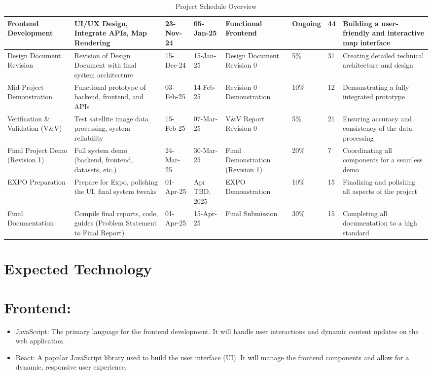 \documentclass{article}
\begin{document}
\begin{table}[h!]
\begin{adjustbox}{max width=\textwidth}
\begin{tabular}{|p{3cm}|p{5cm}|p{2.5cm}|p{2.5cm}|p{4cm}|p{2cm}|p{2.5cm}|p{4cm}|}
  Frontend Development & UI/UX Design, Integrate APIs, Map Rendering & 23-Nov-24 & 05-Jan-25 & Functional Frontend & Ongoing & 44 & Building a user-friendly and interactive map interface \\ \hline
  Design Document Revision & Revision of Design Document with final system architecture & 15-Dec-24 & 15-Jan-25 & Design Document Revision 0 & 5\% & 31 & Creating detailed technical architecture and design \\ \hline
  Mid-Project Demonstration & Functional prototype of backend, frontend, and APIs & 03-Feb-25 & 14-Feb-25 & Revision 0 Demonstration & 10\% & 12 & Demonstrating a fully integrated prototype \\ \hline
  Verification \& Validation (V\&V) & Test satellite image data processing, system reliability & 15-Feb-25 & 07-Mar-25 & V\&V Report Revision 0 & 5\% & 21 & Ensuring accuracy and consistency of the data processing \\ \hline
  Final Project Demo (Revision 1) & Full system demo (backend, frontend, datasets, etc.) & 24-Mar-25 & 30-Mar-25 & Final Demonstration (Revision 1) & 20\% & 7 & Coordinating all components for a seamless demo \\ \hline
  EXPO Preparation & Prepare for Expo, polishing the UI, final system tweaks & 01-Apr-25 & Apr TBD, 2025 & EXPO Demonstration & 10\% & 15 & Finalizing and polishing all aspects of the project \\ \hline
  Final Documentation & Compile final reports, code, guides (Problem Statement to Final Report) & 01-Apr-25 & 15-Apr-25 & Final Submission & 30\% & 15 & Completing all documentation to a high standard \\ \hline
  \end{tabular}
  \end{adjustbox}
  \caption{Project Schedule Overview}
  \end{table}


  \section{Expected Technology}

  \section{Frontend:}
  \begin{itemize}
      \item JavaScript: The primary language for the frontend development. It will handle user interactions and dynamic content updates on the web application.
  
      \item React: A popular JavaScript library used to build the user interface (UI). It will manage the frontend components and allow for a dynamic, responsive user experience.
  \end{itemize}
  
\end{document}
